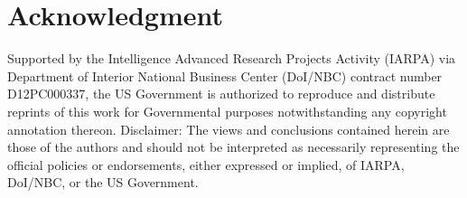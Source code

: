 

\section*{Acknowledgment}
Supported by the Intelligence Advanced Research Projects Activity (IARPA) via Department of Interior National Business Center (DoI/NBC) contract number D12PC000337, the US Government is authorized to reproduce and distribute reprints of this work for Governmental purposes notwithstanding any copyright annotation thereon. Disclaimer: The views and conclusions contained herein are those of the authors and should not be interpreted as necessarily representing the official policies or endorsements, either expressed or implied, of IARPA, DoI/NBC, or the US Government.











